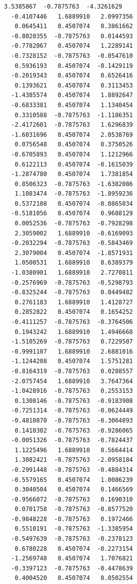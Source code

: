 \documentclass[11pt]{article}
\begin{document}
\begin{Verbatim}[commandchars=\\\{\}]
   3.5385867  -0.7875763  -4.3261629
  -0.4107446   1.6889910   2.0997356
   0.0645411   0.4507074   0.3861662
  -0.8020355  -0.7875763   0.0144593
  -0.7782067   0.4507074   1.2289141
  -0.7328152  -0.7875763  -0.0547610
   0.5936193   0.4507074  -0.1429119
  -0.2019343   0.4507074   0.6526416
   0.1393621   0.4507074   0.3113453
  -1.4385574   0.4507074   1.8892647
  -0.6833381   0.4507074   1.1340454
   0.3310588  -0.7875763  -1.1186351
  -2.4172601  -0.7875763   1.6296839
  -1.6031696   0.4507074   2.0538769
   0.0756548   0.4507074   0.3750526
  -0.6705893   0.4507074   1.1212966
   0.6122113   0.4507074  -0.1615039
  -1.2874780   0.4507074   1.7381854
   0.8506323  -0.7875763  -1.6382086
   1.1083474  -0.7875763  -1.8959236
   0.5372108   0.4507074  -0.0865034
  -0.5181056   0.4507074   0.9688129
   0.0052536  -0.7875763  -0.7928298
   2.3059002   1.6889910  -0.6169093
  -0.2032294  -0.7875763  -0.5843469
   2.3079004   0.4507074  -1.8571931
   1.0500531   1.6889910   0.6389379
  -1.0380901   1.6889910   2.7270811
  -0.2576969  -0.7875763  -0.5298793
  -0.8325244  -0.7875763   0.0449482
   0.2761183   1.6889910   1.4128727
   0.2852822   0.4507074   0.1654252
  -0.4111257  -0.7875763  -0.3764506
   0.1943242   1.6889910   1.4946668
  -1.5105269  -0.7875763   0.7229507
  -0.9991107   1.6889910   2.6881016
  -1.1244208   0.4507074   1.5751281
  -0.8164319  -0.7875763   0.0288557
  -2.0757454   1.6889910   3.7647364
  -1.0428916  -0.7875763   0.2553153
   0.1308146  -0.7875763  -0.9183908
  -0.7251314  -0.7875763  -0.0624449
  -0.4810870  -0.7875763  -0.3064893
   0.1410302  -0.7875763  -0.9286065
  -0.0051326  -0.7875763  -0.7824437
   1.1225496   1.6889910   0.5664414
   1.3082421  -0.7875763  -2.0958184
  -0.2991448  -0.7875763  -0.4884314
  -0.5579165   0.4507074   1.0086239
   0.3040504   0.4507074   0.1466569
  -0.9566072  -0.7875763   0.1690310
   0.0701758  -0.7875763  -0.8577520
  -0.9848228  -0.7875763   0.1972466
   0.5510191  -0.7875763  -1.3385954
  -0.5497639  -0.7875763  -0.2378123
   0.6780228   0.4507074  -0.2273154
  -1.2569748   0.4507074   1.7076821
  -0.3397123  -0.7875763  -0.4478639
   0.4004520   0.4507074   0.0502554


    \end{Verbatim}
\end{document}
